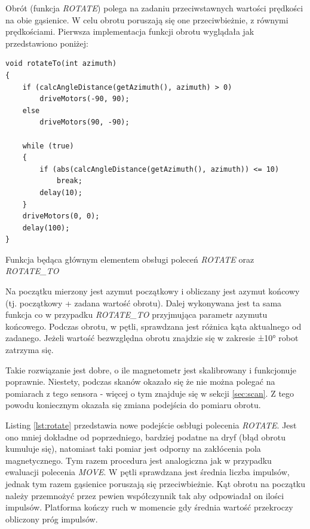Obrót (funkcja \emph{ROTATE}) polega na zadaniu przeciwstawnych wartości prędkości na obie gąsienice. W celu obrotu poruszają się one przeciwbieżnie, z równymi prędkościami. Pierwsza implementacja funkcji obrotu wyglądała jak przedstawiono poniżej:

\begin{listing}[ht]
\begin{verbatim}
void rotateTo(int azimuth)
{
    if (calcAngleDistance(getAzimuth(), azimuth) > 0)
        driveMotors(-90, 90);
    else
        driveMotors(90, -90);

    while (true)
    {
        if (abs(calcAngleDistance(getAzimuth(), azimuth)) <= 10)
            break;
        delay(10);
    }
    driveMotors(0, 0);
    delay(100);
}
\end{verbatim}
\caption{Funkcja będąca głównym elementem obsługi poleceń \emph{ROTATE} oraz \emph{ROTATE\_TO}}
\label{lst:rotate-to-function}
\end{listing}

Na początku mierzony jest azymut początkowy i obliczany jest azymut końcowy (tj. początkowy + zadana wartość obrotu). Dalej wykonywana jest ta sama funkcja co w przypadku \emph{ROTATE\_TO} przyjmująca parametr azymutu końcowego. Podczas obrotu, w pętli, sprawdzana jest różnica kąta aktualnego od zadanego. Jeżeli wartość bezwzględna obrotu znajdzie się w zakresie ±10° robot zatrzyma się.

Takie rozwiązanie jest dobre, o ile magnetometr jest skalibrowany i funkcjonuje poprawnie. Niestety, podczas skanów okazało się że nie można polegać na pomiarach z tego sensora - więcej o tym znajduje się w sekcji \ref{sec:scan}. Z tego powodu koniecznym okazała się zmiana podejścia do pomiaru obrotu.

Listing \ref{lst:rotate} przedstawia nowe podejście osbługi polecenia \emph{ROTATE}. Jest ono mniej dokładne od poprzedniego, bardziej podatne na dryf (błąd obrotu kumuluje się), natomiast taki pomiar jest odporny na zakłócenia pola magnetycznego.
Tym razem procedura jest analogiczna jak w przypadku ewaluacji polecenia \emph{MOVE}. W pętli sprawdzana jest średnia liczba impulsów, jednak tym razem gąsienice poruszają się przeciwbieżnie. Kąt obrotu na początku należy przemnożyć przez pewien współczynnik tak aby odpowiadał on ilości impulsów. Platforma kończy ruch w momencie gdy średnia wartość przekroczy obliczony próg impulsów.


